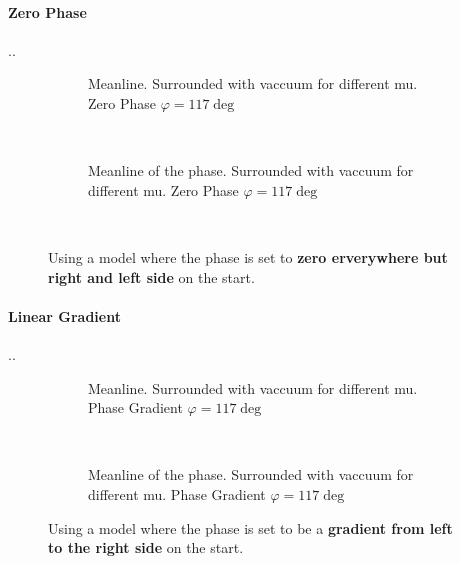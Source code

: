 \documentclass[../main.tex]{subfiles}
\begin{document}
\paragraph{Zero Phase}
..
\begin{figure}[H]
    \begin{subfigure}{0.4\textwidth}
        \centering
        \hspace{-4cm} %
        
        \caption{Meanline. Surrounded with vaccuum for different mu. Zero Phase $\varphi = 117\deg$}
        \label{fig:first}
    \end{subfigure}    \\
    \begin{subfigure}{0.4\textwidth}
        \centering
        \hspace{-4cm} %
        
        \caption{Meanline of the phase. Surrounded with vaccuum for different mu. Zero Phase  $\varphi = 117\deg$}
        \label{fig:first}
    \end{subfigure}    \\
    \caption{Using a model where the phase is set to \textbf{zero erverywhere but right and left side} on the start.}
\end{figure}

\paragraph{Linear Gradient}
..
\begin{figure}[H]
    \begin{subfigure}{0.4\textwidth}
        \centering
        \hspace{-4cm} %
        
        \caption{Meanline. Surrounded with vaccuum for different mu. Phase Gradient $\varphi = 117\deg$}
        \label{fig:first}
    \end{subfigure}    \\
    \begin{subfigure}{0.4\textwidth}
        \centering
        \hspace{-4cm} %
        
        \caption{Meanline of the phase. Surrounded with vaccuum for different mu. Phase Gradient $\varphi = 117\deg$}
        \label{fig:first}
    \end{subfigure}    
    \caption{Using a model where the phase is set to be a \textbf{gradient from left to the right side} on the start.}
    \end{figure}
\end{document}
